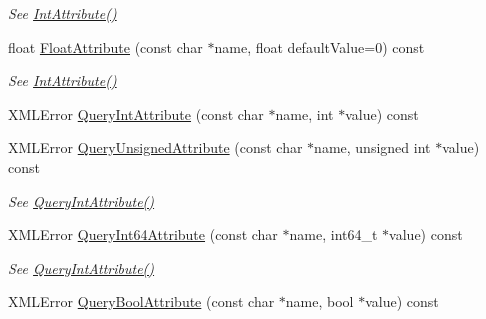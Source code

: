 \begin{DoxyCompactItemize}
\begin{DoxyCompactList}\small\item\em See \hyperlink{classtinyxml2_1_1XMLElement_a1e0b2ebd4ae63ae207f84531c20cfa87}{Int\+Attribute()} \end{DoxyCompactList}\item 
float \hyperlink{classtinyxml2_1_1XMLElement_ae6fa1715869fbed1330992783328cb4a}{Float\+Attribute} (const char $\ast$name, float default\+Value=0) const \hypertarget{classtinyxml2_1_1XMLElement_ae6fa1715869fbed1330992783328cb4a}{}\label{classtinyxml2_1_1XMLElement_ae6fa1715869fbed1330992783328cb4a}

\begin{DoxyCompactList}\small\item\em See \hyperlink{classtinyxml2_1_1XMLElement_a1e0b2ebd4ae63ae207f84531c20cfa87}{Int\+Attribute()} \end{DoxyCompactList}\item 
X\+M\+L\+Error \hyperlink{classtinyxml2_1_1XMLElement_a8b92c729346aa8ea9acd59ed3e9f2378}{Query\+Int\+Attribute} (const char $\ast$name, int $\ast$value) const 
\item 
X\+M\+L\+Error \hyperlink{classtinyxml2_1_1XMLElement_aa3d8d1b9311da8fc249b4352749aaa84}{Query\+Unsigned\+Attribute} (const char $\ast$name, unsigned int $\ast$value) const \hypertarget{classtinyxml2_1_1XMLElement_aa3d8d1b9311da8fc249b4352749aaa84}{}\label{classtinyxml2_1_1XMLElement_aa3d8d1b9311da8fc249b4352749aaa84}

\begin{DoxyCompactList}\small\item\em See \hyperlink{classtinyxml2_1_1XMLElement_a8b92c729346aa8ea9acd59ed3e9f2378}{Query\+Int\+Attribute()} \end{DoxyCompactList}\item 
X\+M\+L\+Error \hyperlink{classtinyxml2_1_1XMLElement_a3d8d0aa8bc4538f4c6989f57e636f051}{Query\+Int64\+Attribute} (const char $\ast$name, int64\+\_\+t $\ast$value) const \hypertarget{classtinyxml2_1_1XMLElement_a3d8d0aa8bc4538f4c6989f57e636f051}{}\label{classtinyxml2_1_1XMLElement_a3d8d0aa8bc4538f4c6989f57e636f051}

\begin{DoxyCompactList}\small\item\em See \hyperlink{classtinyxml2_1_1XMLElement_a8b92c729346aa8ea9acd59ed3e9f2378}{Query\+Int\+Attribute()} \end{DoxyCompactList}\item 
X\+M\+L\+Error \hyperlink{classtinyxml2_1_1XMLElement_a2a58ee941c3cda23772c887a8f8b534e}{Query\+Bool\+Attribute} (const char $\ast$name, bool $\ast$value) const \hypertarget{classtinyxml2_1_1XMLElement_a2a58ee941c3cda23772c887a8f8b534e}{}\label{classtinyxml2_1_1XMLElement_a2a58ee941c3cda23772c887a8f8b534e}


\end{DoxyCompactItemize}
